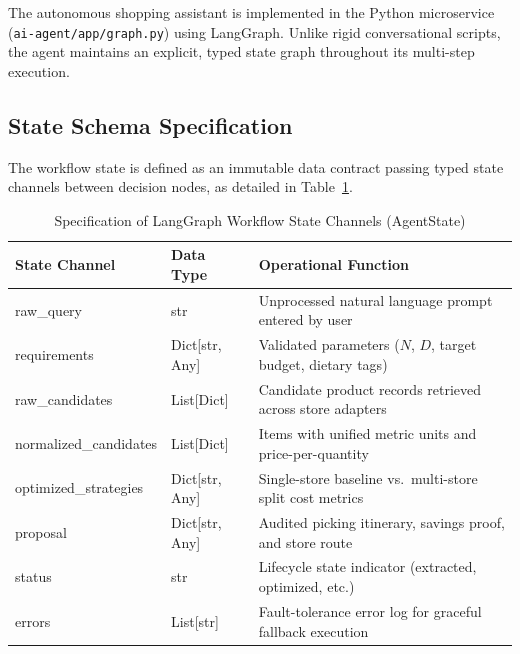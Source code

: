 The autonomous shopping assistant is implemented in the Python microservice (\texttt{ai-agent/app/graph.py}) using LangGraph. Unlike rigid conversational scripts, the agent maintains an explicit, typed state graph throughout its multi-step execution.

\subsection{State Schema Specification}
The workflow state is defined as an immutable data contract passing typed state channels between decision nodes, as detailed in Table~\ref{tab:agent_state}.

\begin{table}[H]
\centering
\caption{Specification of LangGraph Workflow State Channels (AgentState)}
\label{tab:agent_state}
\begin{tabular}{>{\raggedright\arraybackslash}p{4.45cm} >{\raggedright\arraybackslash}p{2.1cm} >{\raggedright\arraybackslash}p{7.45cm}}
\toprule
\textbf{State Channel} & \textbf{Data Type} & \textbf{Operational Function} \\
\midrule
raw\_query & str & Unprocessed natural language prompt entered by user \\
requirements & Dict[str, Any] & Validated parameters ($N$, $D$, target budget, dietary tags) \\
raw\_candidates & List[Dict] & Candidate product records retrieved across store adapters \\
normalized\_candidates & List[Dict] & Items with unified metric units and price-per-quantity \\
optimized\_strategies & Dict[str, Any] & Single-store baseline vs.\ multi-store split cost metrics \\
proposal & Dict[str, Any] & Audited picking itinerary, savings proof, and store route \\
status & str & Lifecycle state indicator (extracted, optimized, etc.) \\
errors & List[str] & Fault-tolerance error log for graceful fallback execution \\
\bottomrule
\end{tabular}
\end{table}

